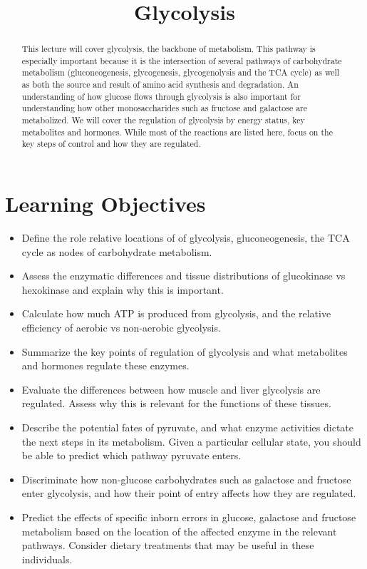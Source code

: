\documentclass{tufte-handout}
\title{Glycolysis}
\author{}
\date{}  %
\begin{document}
\maketitle%

\begin{abstract}
\noindent This lecture will cover glycolysis, the backbone of metabolism.  This pathway is especially important because it is the intersection of several pathways of carbohydrate metabolism (gluconeogenesis, glycogenesis, glycogenolysis and the TCA cycle) as well as both the source and result of amino acid synthesis and degradation.  An understanding of how glucose flows through glycolysis is also important for understanding how other monosaccharides such as fructose and galactose are metabolized.  We will cover the regulation of glycolysis by energy status, key metabolites and hormones.  While most of the reactions are listed here, focus on the key steps of control and how they are regulated.  
\end{abstract}

\tableofcontents
\pagebreak
\section{Learning Objectives}

\begin{itemize}
\item Define the role relative locations of of glycolysis, gluconeogenesis, the TCA cycle as nodes of carbohydrate metabolism.
\item Assess the enzymatic differences and tissue distributions of glucokinase vs hexokinase and explain why this is important.
\item Calculate how much ATP is produced from glycolysis, and the relative efficiency of aerobic vs non-aerobic glycolysis.
\item Summarize the key points of regulation of glycolysis and what metabolites and hormones regulate these enzymes.
\item Evaluate the differences between how muscle and liver glycolysis are regulated.  Assess why this is relevant for the functions of these tissues.
\item Describe the potential fates of pyruvate, and what enzyme activities dictate the next steps in its metabolism.  Given a particular cellular state, you should be able to predict which pathway pyruvate enters.
\item Discriminate how non-glucose carbohydrates such as galactose and fructose enter glycolysis, and how their point of entry affects how they are regulated.
\item Predict the effects of specific inborn errors in glucose, galactose and fructose metabolism based on the location of the affected  enzyme in the relevant pathways.  Consider dietary treatments that may be useful in these individuals.

\end{itemize}
\end{document}
